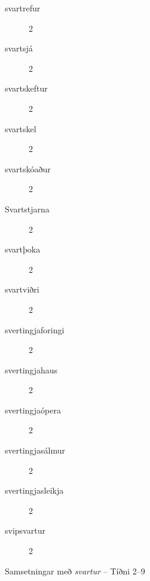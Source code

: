 \documentclass[../samsetningasafn.tex]{subfiles}
\begin{document}
\begin{bigwordlist}
\begin{footnotesize}
\begin{multicols}{4}
\begin{description}
		\item [svartrefur]		2
		\item [svartsjá]		2
		\item [svartskeftur]		2
		\item [svartskel]		2
		\item [svartskóaður]	2
		\item [Svartstjarna]		2
		\item [svartþoka]		2
		\item [svartviðri]		2
		\item [svertingjaforingi]	2
		\item [svertingjahaus]	2
		\item [svertingjaópera]	2
		\item [svertingjasálmur]	2
		\item [svertingjasleikja]	2
		\item [svipsvartur]		2
	\end{description}
\end{multicols}
\end{footnotesize}

\label{listi:svart9}
\caption{Samsetningar með \textit{svartur} -- Tíðni 2--9}
\end{bigwordlist}

\end{document}
